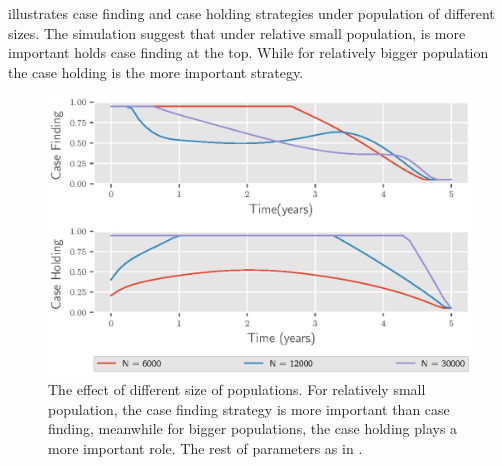  illustrates case finding and case holding 
strategies under population of different sizes. The simulation suggest that
under relative small population, is more important holds case finding at the 
top. While for relatively bigger population the case holding is the more 
important strategy.
\begin{figure}
\centering
\includegraphics{Figures/figure_3_two_strain_tbm}
  \caption{
    The effect of different size of populations. For 
    relatively small population, the case finding strategy is more important 
    than case finding, meanwhile for  bigger populations, the case holding 
    plays a more important role. The rest of parameters as in 
    .
  }
  \label{fig:figure3twostraintbm}
\end{figure}



 